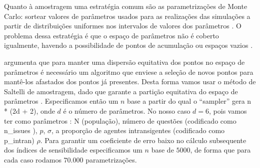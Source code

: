 Quanto à amostragem uma estratégia comum são as parametrizações de Monte Carlo:
sortear valores de parâmetros usados para as realizações das simulações a partir
de distribuições uniformes nos intervalos de valores dos parâmetros
\cite{laver2011party}. O problema dessa estratégia é que o espaço de parâmetros
não é coberto igualmente, havendo a possibilidade de pontos de acumulação ou
espaços vazios \cite{pereda2017brief}.

 argumenta que para manter uma dispersão equitativa
dos pontos no espaço de parâmetros é necessário um algoritmo que enviese a
seleção de novos pontos para mantê-los afastados dos pontos já presentes. Desta
forma vamos usar o método de Saltelli de amostragem, dado que garante a partição
equitativa do espaço de parâmetros \cite{herman2017salib}. Especificamos então
um \(n\) base a partir do qual o ``sampler'' gera n * (2d + 2), onde \(d\) é o
número de parâmetros. No nosso caso \(d = 6\), pois vamos ter como parâmetros :
N (população), número de questões (codificado como n\_issues ), \(p\), \(\sigma\), a
proporção de agentes intransigentes (codificado como p\_intran)
\(\rho\). Para garantir um coeficiente de erro baixo no cálculo
subsequente dos índices de sensibilidade especificamos um \(n\) base de
\(5000\), de forma que para cada caso rodamos \(70.000\) parametrizações.


